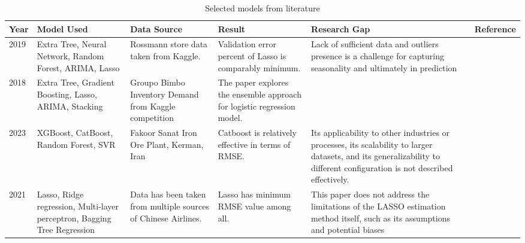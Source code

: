 


\begin{table}[hbt!]
\begin{sidewaystable}
\caption{Selected models from literature}
\setlength{\tabcolsep}{2pt}
 {\renewcommand{\arraystretch}{1}%
\label{tab:my-table}
\begin{tabular}[c]{p{}p{}p{}p{}p{}p{}}
\hline
\textbf{Year} & \textbf{Model Used }                                                                & \textbf{Data Source}                                                                              & \textbf{Result}                                                             & \textbf{Research Gap}  & \textbf{Reference}\\ \hline
2019 & Extra Tree,   Neural Network, Random Forest, ARIMA, Lasso                  & Rossmann   store data taken from Kaggle.                                                 & Validation   error percent of Lasso is comparably minimum.          & Lack of sufficient data and outliers presence is a challenge for capturing seasonality and ultimately in prediction  &\cite{pavlyshenko2019machine}  \\ \hline
2018 & Extra Tree,   Gradient Boosting, Lasso, ARIMA, Stacking                    & Groupo Bimbo   Inventory Demand from Kaggle competition                                  & The paper explores the ensemble approach for logistic regression model.                                                                    & \centering         & \cite{pavlyshenko2018using} \\ \hline
2023 & XGBoost,   CatBoost, Random Forest, SVR                                    & Fakoor Sanat Iron Ore Plant, Kerman,   Iran                                              & Catboost is   relatively effective in terms of RMSE.                & Its applicability to other industries or processes, its scalability to larger datasets, and its generalizability to different configuration is not described effectively.  &\cite{chelgani2023modeling}   \\ \hline

2021 & Lasso, Ridge   regression, Multi-layer perceptron, Bagging Tree Regression & Data has been   taken from multiple sources of Chinese Airlines.                         & Lasso has   minimum RMSE value among all.                           & This paper does not address the limitations of the LASSO estimation method itself, such as its assumptions and potential biases  &\cite{xu2021influential}  \\ \hline


\end{tabular}}
\end{sidewaystable}
\end{table}
